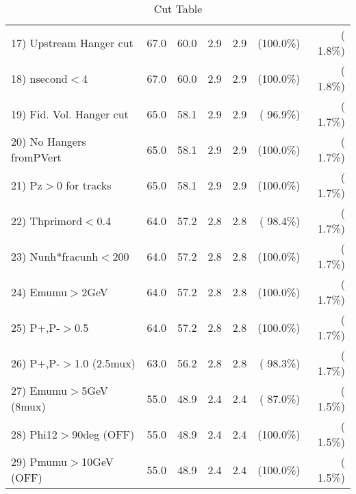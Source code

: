 \begin{table}[h!]
\begin{tabular}{||l||r|r|r|r|r|r||}
 17) Upstream Hanger cut  &         67.0 &         60.0 &          2.9 &          2.9 & (100.0\%) & (  1.8\%) \\
 18) nsecond$<$4          &         67.0 &         60.0 &          2.9 &          2.9 & (100.0\%) & (  1.8\%) \\
 19) Fid. Vol. Hanger cut &         65.0 &         58.1 &          2.9 &          2.9 & ( 96.9\%) & (  1.7\%) \\
 20) No Hangers fromPVert &         65.0 &         58.1 &          2.9 &          2.9 & (100.0\%) & (  1.7\%) \\
 21) Pz$>$0 for tracks    &         65.0 &         58.1 &          2.9 &          2.9 & (100.0\%) & (  1.7\%) \\
 22) Thprimord$<$0.4      &         64.0 &         57.2 &          2.8 &          2.8 & ( 98.4\%) & (  1.7\%) \\
 23) Nunh*fracunh$<$200   &         64.0 &         57.2 &          2.8 &          2.8 & (100.0\%) & (  1.7\%) \\
 24) Emumu$>$2GeV         &         64.0 &         57.2 &          2.8 &          2.8 & (100.0\%) & (  1.7\%) \\
 25) P+,P-$>$0.5          &         64.0 &         57.2 &          2.8 &          2.8 & (100.0\%) & (  1.7\%) \\
 26) P+,P-$>$1.0 (2.5mux) &         63.0 &         56.2 &          2.8 &          2.8 & ( 98.3\%) & (  1.7\%) \\
 27) Emumu$>$5GeV  (8mux) &         55.0 &         48.9 &          2.4 &          2.4 & ( 87.0\%) & (  1.5\%) \\
 28) Phi12$>$90deg  (OFF) &         55.0 &         48.9 &          2.4 &          2.4 & (100.0\%) & (  1.5\%) \\
 29) Pmumu$>$10GeV  (OFF) &         55.0 &         48.9 &          2.4 &          2.4 & (100.0\%) & (  1.5\%) \\
 \hline
 \hline
 \end{tabular}
 \caption{Cut Table           }
 \label{tab-cutcohjpsi-mumu_cohphi0}
 \end{table}
